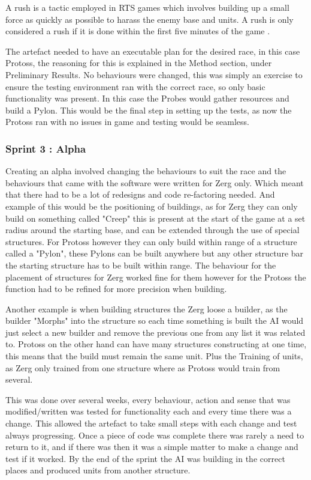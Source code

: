 \documentclass[journal]{IEEEtran}
\begin{document}
A rush is a tactic employed in RTS games which involves building up a small force as quickly as possible to harass the enemy base and units. A rush is only considered a rush if it is done within the first five minutes of the game \cite{Liqui}.

The artefact needed to have an executable plan for the desired race, in this case Protoss, the reasoning for this is explained in the Method section, under Preliminary Results. No behaviours were changed, this was simply an exercise to ensure the testing environment ran with the correct race, so only basic functionality was present. In this case the Probes would gather resources and build a Pylon. This would be the final step in setting up the tests, as now the Protoss ran with no issues in game and testing would be seamless.
\newline

\subsubsection{Sprint 3 : Alpha}
Creating an alpha involved changing the behaviours to suit the race and the behaviours that came with the software were written for Zerg only. Which meant that there had to be a lot of redesigns and code re-factoring needed. And example of this would be the positioning of buildings, as for Zerg they can only build on something called "Creep" this is present at the start of the game at a set radius around the starting base, and can be extended through the use of special structures. For Protoss however they can only build within range of a structure called a "Pylon", these Pylons can be built anywhere but any other structure bar the starting structure has to be built within range. The behaviour for the placement of structures for Zerg worked fine for them however for the Protoss the function had to be refined for more precision when building. 

Another example is when building structures the Zerg loose a builder, as the builder "Morphs" into the structure so each time something is built the AI would just select a new builder and remove the previous one from any list it was related to. Protoss on the other hand can have many structures constructing at one time, this means that the build must remain the same unit. Plus the Training of units, as Zerg only trained from one structure where as Protoss would train from several.

This was done over several weeks, every behaviour, action and sense that was modified/written was tested for functionality each and every time there was a change. This allowed the artefact to take small steps with each change and test always progressing. Once a piece of code was complete there was rarely a need to return to it, and if there was then it was a simple matter to make a change and test if it worked. By the end of the sprint the AI was building in the correct places and produced units from another structure.
\newline
{}
\end{document}
